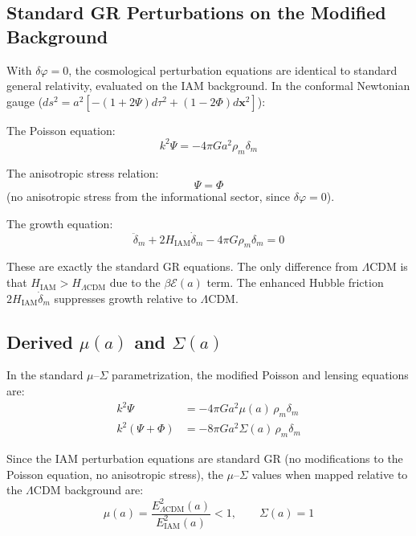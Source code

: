 \documentclass[aps,prd,twocolumn,superscriptaddress,nofootinbib]{revtex4-2}
\begin{document}
\subsection{Standard GR Perturbations on the Modified Background}

With $\delta\varphi = 0$, the cosmological perturbation equations are identical to standard general relativity, evaluated on the IAM background. In the conformal Newtonian gauge ($ds^2 = a^2[-(1+2\Psi)d\tau^2 + (1-2\Phi)d\mathbf{x}^2]$):

The Poisson equation:
\begin{equation}
k^2\Psi = -4\pi G a^2 \rho_m \delta_m
\end{equation}

The anisotropic stress relation:
\begin{equation}
\Psi = \Phi
\end{equation}
(no anisotropic stress from the informational sector, since $\delta\varphi = 0$).

The growth equation:
\begin{equation}
\ddot{\delta}_m + 2H_\text{IAM}\dot{\delta}_m - 4\pi G\rho_m\delta_m = 0
\label{eq:growth_IAM}
\end{equation}

These are exactly the standard GR equations. The only difference from $\Lambda$CDM is that $H_\text{IAM} > H_{\Lambda\text{CDM}}$ due to the $\beta\mathcal{E}(a)$ term. The enhanced Hubble friction $2H_\text{IAM}\dot{\delta}_m$ suppresses growth relative to $\Lambda$CDM.

\subsection{Derived $\mu(a)$ and $\Sigma(a)$}

In the standard $\mu$--$\Sigma$ parametrization, the modified Poisson and lensing equations are:
\begin{align}
k^2\Psi &= -4\pi G a^2 \mu(a)\,\rho_m\delta_m \\
k^2(\Psi + \Phi) &= -8\pi G a^2 \Sigma(a)\,\rho_m\delta_m
\end{align}

Since the IAM perturbation equations are standard GR (no modifications to the Poisson equation, no anisotropic stress), the $\mu$--$\Sigma$ values when mapped relative to the $\Lambda$CDM background are:
\begin{equation}
\boxed{\mu(a) = \frac{E^2_{\Lambda\text{CDM}}(a)}{E^2_\text{IAM}(a)} < 1, \qquad \Sigma(a) = 1}
\label{eq:mu_sigma_derived}
\end{equation}
\end{document}
